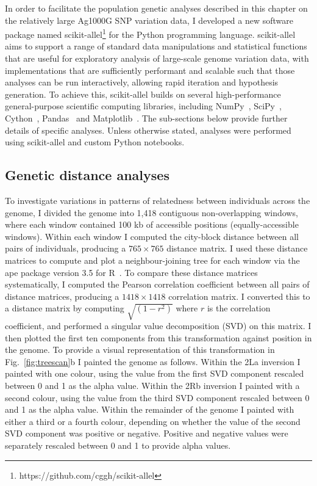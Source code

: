 \documentclass[a4paper,11pt,abstracton,hidelinks]{scrartcl}
\begin{document}
In order to facilitate the population genetic analyses described in this chapter on the relatively large Ag1000G SNP variation data, I developed a new software package named scikit-allel\footnote{https://github.com/cggh/scikit-allel} for the Python programming language.
%
scikit-allel aims to support a range of standard data manipulations and statistical functions that are useful for exploratory analysis of large-scale genome variation data, with implementations that are sufficiently performant and scalable such that those analyses can be run interactively, allowing rapid iteration and hypothesis generation.
%
To achieve this, scikit-allel builds on several high-performance general-purpose scientific computing libraries, including NumPy~\parencite{Harris2020}, SciPy~\parencite{Virtanen2020}, Cython~\parencite{Behnel2011}, Pandas~\parencite{McKinney2010} and Matplotlib~\parencite{Hunter2007}.
%
The sub-sections below provide further details of specific analyses.
%
Unless otherwise stated, analyses were performed using scikit-allel and custom Python notebooks.


\subsection{Genetic distance analyses}\label{subsec:methods-genetic-distance}

To investigate variations in patterns of relatedness between individuals across the genome, I divided the genome into 1,418 contiguous non-overlapping windows, where each window contained 100 kb of accessible positions (equally-accessible windows).
%
Within each window I computed the city-block distance between all pairs of individuals, producing a $765 \times 765$ distance matrix.
%
I used these distance matrices to compute and plot a neighbour-joining tree for each window via the ape package version 3.5 for R~\parencite{Popescu2012}.
%
To compare these distance matrices systematically, I computed the Pearson correlation coefficient between all pairs of distance matrices, producing a $1418 \times 1418$ correlation matrix.
%
I converted this to a distance matrix by computing $\sqrt{(1-r^{2})}$ where $r$ is the correlation coefficient, and performed a singular value decomposition (SVD) on this matrix.
%
I then plotted the first ten components from this transformation against position in the genome.
%
To provide a visual representation of this transformation in Fig.~\ref{fig:treescan}b I painted the genome as follows.
%
Within the 2La inversion I painted with one colour, using the value from the first SVD component
rescaled between 0 and 1 as the alpha value.
%
Within the 2Rb inversion I painted with a second colour, using the value from the third SVD component rescaled between 0 and 1 as the alpha value.
%
Within the remainder of the genome I painted with either a third or a fourth colour, depending on whether the value of the second SVD component was positive or negative.
%
Positive and negative values were separately rescaled between 0 and 1 to provide alpha values.
\end{document}
